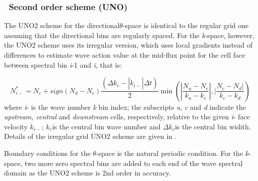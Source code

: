 \vssub
\subsubsection{~Second  order scheme (UNO)}

\noindent
The UNO2 scheme for the directional$\theta$-space is identical to
the regular grid one assuming that the directional bins
are regularly spaced. For the \emph{k}-space, however, the UNO2 scheme
uses its irregular version, which uses local gradients instead of
differences to estimate wave action value at the mid-flux point for
the cell face between spectral bin \emph{i}-1 and \emph{i}, that is:

\begin{equation}
N_{i-}^{*}=N_{c}+sign\left(N_{d}-N_{c}\right)\frac{\left(\Delta k_{c}-|\dot{k}_{i-}|\Delta t\right)}{2}\min\left(|\frac{N_{u}-N_{c}}{k_{u}-k_{c}}|,|\frac{N_{c}-N_{d}|}{k_{c}-k_{d}}\right)
\label{eq:UNO2irregular}
\end{equation}
where \emph{i}- is the wave number \emph{k} bin index; the subscripts
\emph{u}, \emph{c} and \emph{d} indicate the \emph{upstream, central}
and \emph{downstream} cells, respectively, relative to the given \emph{i}-
face velocity $\dot{k}_{i-}$; $k_{c}$is the central bin wave number
and $\Delta k_{c}$is the central bin widith. Details of the irregular
grid UNO2 scheme are given in \cite{art:Li08}. 

Boundary conditions for the $\theta$-space is the natural periodic
condition. For the \emph{k}-space, two more zero spectral bins are
added to each end of the wave spectral domain as the UNO2 scheme is
2nd order in accuracy.


